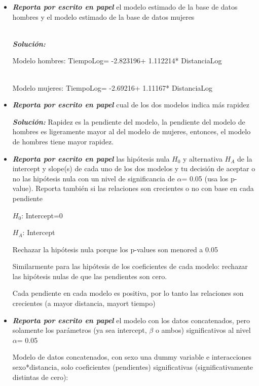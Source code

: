 \documentclass[letterpaper,11pt]{article}
\begin{document}
\begin{itemize}
\item \textbf{\textit{Reporta por escrito en papel}} el modelo estimado de la base de datos hombres y el 
modelo estimado de la base de datos mujeres 

\\

\textbf{\textit{Soluci\'on:}}

Modelo hombres: TiempoLog= -2.823196+ 1.112214* DistanciaLog

\\

Modelo mujeres: TiempoLog= -2.69216+ 1.11167* DistanciaLog


\item \textbf{\textit{Reporta por escrito en papel}} cual de los dos modelos indica m\'as rapidez

\textbf{\textit{Soluci\'on:}} Rapidez es la pendiente del modelo, la pendiente del modelo de hombres es ligeramente mayor al del modelo de mujeres, entonces, el modelo de hombres tiene mayor rapidez.

\item \textbf{\textit{Reporta por escrito en papel}} las hip\'otesis nula $H_{0}$ y alternativa $H_{A}$ de 
la intercept y slope(s) de cada uno de los dos modelos y tu decisi\'on de aceptar o no las hip\'otesis nula con un nivel de 
significancia de $\alpha$= 0.05 (usa los p-value). Reporta tambi\'en si las relaciones son crecientes o no 
con base en cada pendiente

$H_{0}$: Intercept=0

$H_{A}$: Intercept 

Rechazar la hip\'otesis nula porque los p-values son menored a 0.05

Similarmente para las hip\'otesis de los coeficientes de cada modelo: rechazar las hip\'otesis nulas de que las pendientes son cero.

Cada pendiente en cada modelo es positiva, por lo tanto las relaciones son crecientes (a mayor distancia, mayort tiempo)

\item \textbf{\textit{Reporta por escrito en papel}} el modelo con los datos concatenados, pero
solamente los par\'ametros (ya sea intercept, $\beta$ o ambos) significativos al nivel $\alpha$= 0.05

Modelo de datos concatenados, con sexo una dummy variable e interacciones sexo*distancia, solo coeficientes (pendientes) significativas
(significativamente distintas de cero):\\


\end{itemize}
\end{document}

